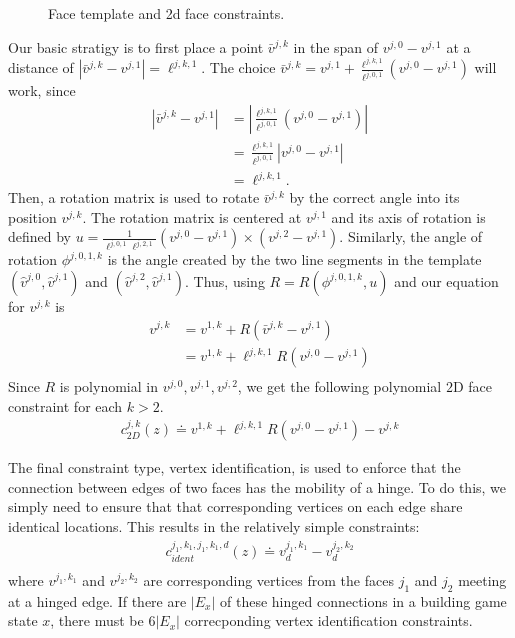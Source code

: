 \begin{figure}[ht]
\caption{Face template and 2d face constraints.}
\label{fig:2DFC}
\end{figure}

Our basic stratigy is to first place a point $\bar{v}^{j,k}$ in the span of $v^{j,0} - v^{j,1}$ at a distance of $|\bar{v}^{j,k} - v^{j,1}| = \ell^{j,k,1}$. The choice $\bar{v}^{j,k} = v^{j,1} + \frac{\ell^{j,k,1}}{\ell^{j,0,1}}(v^{j,0} - v^{j,1})$ will work, since 
\begin{align}
  |\bar{v}^{j,k} - v^{j,1}| &= |\frac{\ell^{j,k,1}}{\ell^{j,0,1}}(v^{j,0} - v^{j,1})| \\
  &= \frac{\ell^{j,k,1}}{\ell^{j,0,1}}|v^{j,0} - v^{j,1}| \\
  &= \ell^{j,k,1}.
\end{align}
Then, a rotation matrix is used to rotate $\bar{v}^{j,k}$ by the correct angle into its position $v^{j,k}$.
The rotation matrix is centered at $v^{j,1}$ and its axis of rotation is defined by $u = \frac{1}{\ell^{j,0,1}\ell^{j,2,1}}(v^{j,0} - v^{j,1})\times(v^{j,2} - v^{j,1})$.  Similarly, the angle of rotation $\phi^{j,0,1,k}$ is the angle created by the two line segments in the template $(\hat{v}^{j,0},\hat{v}^{j,1})$ and  $(\hat{v}^{j,2},\hat{v}^{j,1})$. Thus, using $R = R(\phi^{j,0,1,k}, u)$ and our equation for $v^{j,k}$ is 
\begin{align}
v^{j,k} &= v^{1,k} + R(\bar{v}^{j,k} - v^{j,1})\\
&= v^{1,k} + \ell^{j,k,1}R(v^{j,0} - v^{j,1})\\
\end{align}
Since $R$ is polynomial in $v^{j,0}, v^{j,1}, v^{j,2}$, we get the following polynomial $2$D face constraint for each $k > 2$.
\begin{align}
c_{2D}^{j,k}(z) \doteq v^{1,k} + \ell^{j,k,1}R(v^{j,0} - v^{j,1}) - v^{j,k}
\end{align} 

The final constraint type, vertex identification, is used to enforce that the connection between edges of two faces has the mobility of a hinge. To do this, we simply need to ensure that that corresponding vertices on each edge share identical locations. This results in the relatively simple constraints:
\begin{align}
c_{ident}^{j_1,k_1,j_1,k_1,d}(z) \doteq v^{j_1,k_1}_d - v^{j_2,k_2}_d \\
\end{align}
where $v^{j_1,k_1}$ and $v^{j_2,k_2}$ are corresponding vertices from the faces $j_1$ and $j_2$ meeting at a hinged edge. If there are $|E_x|$ of these hinged connections in a building game state $x$, there must be $6|E_x|$ correcponding vertex identification constraints.

